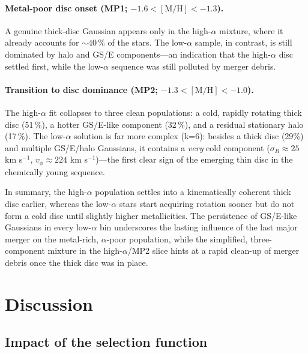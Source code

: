 \documentclass[a4paper,12pt]{article}
\begin{document}
\paragraph{Metal-poor disc onset (\textbf{MP1};
$-1.6<[\mathrm{M/H}]<-1.3$).}
A genuine thick-disc Gaussian appears only in the
\mbox{high-$\alpha$} mixture, where it already accounts for
$\sim40$\,\% of the stars.  The \mbox{low-$\alpha$} sample, in
contrast, is still dominated by halo and GS/E components—an
indication that the high-$\alpha$ disc settled first, while the
\mbox{low-$\alpha$} sequence was still polluted by merger debris.

\paragraph{Transition to disc dominance (\textbf{MP2};
$-1.3<[\mathrm{M/H}]<-1.0$).}
The high-$\alpha$ fit collapses to three clean populations:  
a cold, rapidly rotating thick disc (51\,\%), a hotter GS/E-like
component (32\,\%), and a residual stationary halo (17\,\%).
The \mbox{low-$\alpha$} solution is far more complex
(k=6): besides a thick disc (29\%) and multiple GS/E/halo
Gaussians, it contains a \emph{very} cold component
(\(\sigma_R\!\approx\!25\) km s\(^{-1}\),
\(v_\phi\!\approx\!224\) km s\(^{-1}\))—the first clear sign of the
emerging thin disc in the chemically young sequence.

\medskip
In summary, the high-$\alpha$ population settles into a
kinematically coherent thick disc earlier, whereas the
\mbox{low-$\alpha$} stars start acquiring rotation sooner but do
not form a cold disc until slightly higher metallicities.  The
persistence of GS/E-like Gaussians in every low-$\alpha$
bin underscores the lasting influence of the last major merger on
the metal-rich, $\alpha$-poor population, while the simplified,
three-component mixture in the high-$\alpha$/MP2 slice hints at a
rapid clean-up of merger debris once the thick disc was in place.

\section{Discussion} \label{sec:discussion}

\subsection{Impact of the selection function}
\label{subsec:sel_fn}
\end{document}
